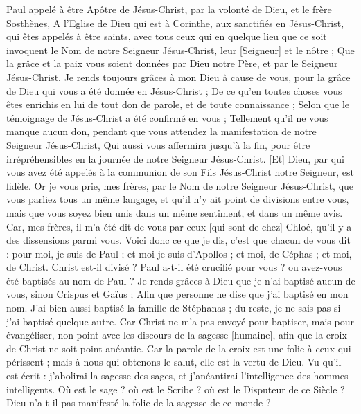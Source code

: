 \BFont
\begin{multicols}{2}
\VerseOne{}Paul appelé à être Apôtre de Jésus-Christ, par la volonté de Dieu, et le frère Sosthènes,
A l'Eglise de Dieu qui est à Corinthe, aux sanctifiés en Jésus-Christ, qui êtes appelés à être saints, avec tous ceux qui en quelque lieu que ce soit invoquent le Nom de notre Seigneur Jésus-Christ, leur [Seigneur] et le nôtre ;
Que la grâce et la paix vous soient données par Dieu notre Père, et par le Seigneur Jésus-Christ.
Je rends toujours grâces à mon Dieu à cause de vous, pour la grâce de Dieu qui vous a été donnée en Jésus-Christ ;
De ce qu'en toutes choses vous êtes enrichis en lui de tout don de parole, et de toute connaissance ;
Selon que le témoignage de Jésus-Christ a été confirmé en vous ;
Tellement qu'il ne vous manque aucun don, pendant que vous attendez la manifestation de notre Seigneur Jésus-Christ,
Qui aussi vous affermira jusqu’à la fin, pour être irrépréhensibles en la journée de notre Seigneur Jésus-Christ.
[Et] Dieu, par qui vous avez été appelés à la communion de son Fils Jésus-Christ notre Seigneur, est fidèle.
Or je vous prie, mes frères, par le Nom de notre Seigneur Jésus-Christ, que vous parliez tous un même langage, et qu'il n'y ait point de divisions entre vous, mais que vous soyez bien unis dans un même sentiment, et dans un même avis.
Car, mes frères, il m'a été dit de vous par ceux [qui sont de chez] Chloé, qu'il y a des dissensions parmi vous.
Voici donc ce que je dis, c'est que chacun de vous dit : pour moi, je suis de Paul ; et moi je suis d'Apollos ; et moi, de Céphas ; et moi, de Christ.
Christ est-il divisé ? Paul a-t-il été crucifié pour vous ? ou avez-vous été baptisés au nom de Paul ?
Je rends grâces à Dieu que je n'ai baptisé aucun de vous, sinon Crispus et Gaïus ;
Afin que personne ne dise que j'ai baptisé en mon nom.
J'ai bien aussi baptisé la famille de Stéphanas ; du reste, je ne sais pas si j'ai baptisé quelque autre.
Car Christ ne m'a pas envoyé pour baptiser, mais pour évangéliser, non point avec les discours de la sagesse [humaine], afin que la croix de Christ ne soit point anéantie.
Car la parole de la croix est une folie à ceux qui périssent ; mais à nous qui obtenons le salut, elle est la vertu de Dieu.
Vu qu'il est écrit : j'abolirai la sagesse des sages, et j'anéantirai l'intelligence des hommes intelligents.
Où est le sage ? où est le Scribe ? où est le Disputeur de ce Siècle ? Dieu n'a-t-il pas manifesté la folie de la sagesse de ce monde ?

\end{multicols}

